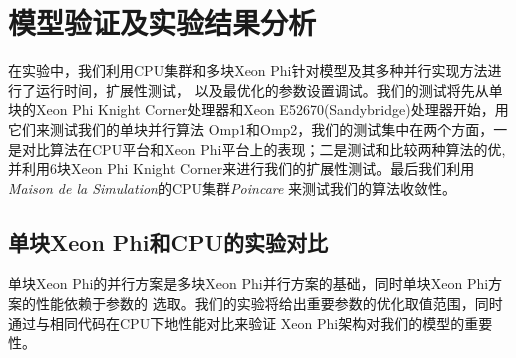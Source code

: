 \chapter{模型验证及实验结果分析}
\label{chap:exp}

在实验中，我们利用CPU集群和多块Xeon Phi针对模型及其多种并行实现方法进行了运行时间，扩展性测试，
以及最优化的参数设置调试。我们的测试将先从单块的Xeon Phi Knight Corner处理器和Xeon E52670(Sandybridge)处理器开始，用它们来测试我们的单块并行算法
Omp1和Omp2，我们的测试集中在两个方面，一是对比算法在CPU平台和Xeon Phi平台上的表现；二是测试和比较两种算法的优, 
并利用6块Xeon Phi Knight Corner来进行我们的扩展性测试。最后我们利用\textsl{Maison de la Simulation}的CPU集群\textsl{Poincare}
来测试我们的算法收敛性。
\section{单块Xeon Phi和CPU的实验对比} %
\label{sec:singleMIC-CPU}
单块Xeon Phi的并行方案是多块Xeon Phi并行方案的基础，同时单块Xeon Phi方案的性能依赖于参数的
选取。我们的实验将给出重要参数的优化取值范围，同时通过与相同代码在CPU下地性能对比来验证
Xeon Phi架构对我们的模型的重要性。

